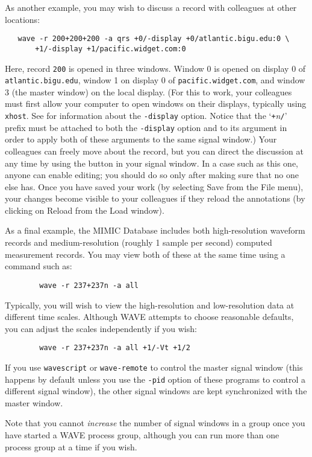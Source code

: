 \documentclass[twoside]{book}
\newcommand{\button}[1]{\cornersize{2}\ovalbox{\rule[-.3mm]{0cm}{2.5mm}\small\sf ~#1~}}
\newcommand{\WAVE}{{\sf WAVE}\xspace}
\begin{document}
As another example, you may wish to discuss a record with colleagues
at other locations:
\begin{verbatim}
   wave -r 200+200+200 -a qrs +0/-display +0/atlantic.bigu.edu:0 \
       +1/-display +1/pacific.widget.com:0
\end{verbatim}
Here, record {\tt 200} is opened in three windows.  Window 0 is opened on
display 0 of {\tt atlantic.bigu.edu}, window 1 on display 0 of
{\tt pacific.widget.com}, and window 3 (the master window) on the local
display.  (For this to work, your colleagues must first allow your
computer to open windows on their displays, typically using
{\tt xhost}.  See
for information about the {\tt -display} option.  Notice that the
`{\tt +}{\it n}{\tt /}' prefix must be attached to
both the {\tt -display} option and to its argument in order to
apply both of these arguments to the same signal window.)
Your colleagues can freely move about the record, but you can direct
the discussion at any time by using the \button{Sync} button in your signal
window.  In a case such as this one, anyone can enable editing; you
should do so only after making sure that no one else has.  Once you
have saved your work (by selecting {\sf Save} from the {\sf File} menu), your
changes become visible to your colleagues if they reload the
annotations (by clicking on {\sf Reload} from the {\sf Load} window).

As a final example, the MIMIC Database includes both high-resolution
waveform records and medium-resolution (roughly 1 sample per second)
computed measurement records.  You may view both of these at the same
time using a command such as:
\begin{verbatim}
        wave -r 237+237n -a all
\end{verbatim}
Typically, you will wish to view the high-resolution and low-resolution
data at different time scales.  Although \WAVE{} attempts to choose
reasonable defaults, you can adjust the scales independently if you wish:
\begin{verbatim}
        wave -r 237+237n -a all +1/-Vt +1/2
\end{verbatim}

If you use {\tt wavescript} or {\tt wave-remote} to control the master
signal window (this happens by default unless you use the {\tt -pid} option
of these programs to control a different signal window), the other signal
windows are kept synchronized with the master window.

Note that you cannot \emph{increase} the number of signal windows in a group
once you have started a \WAVE{} process group, although you can run more
than one process group at a time if you wish.
\end{document}
